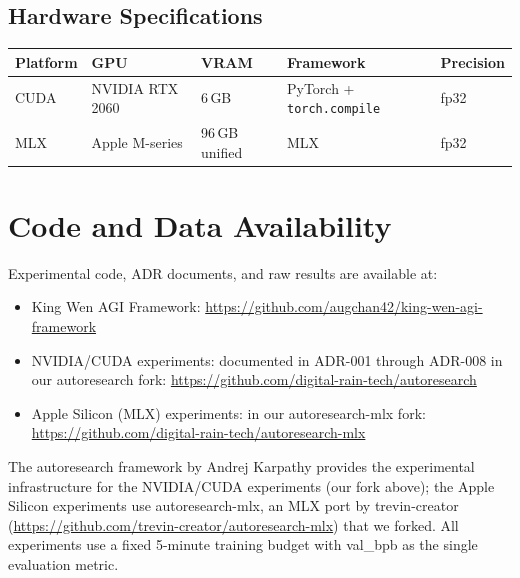 \documentclass{article}
\begin{document}
\subsection{Hardware Specifications}

\begin{table}[h]
\centering
\begin{tabular}{lllll}
\toprule
\textbf{Platform} & \textbf{GPU} & \textbf{VRAM} & \textbf{Framework} & \textbf{Precision} \\
\midrule
CUDA & NVIDIA RTX 2060 & 6\,GB & PyTorch + \texttt{torch.compile} & fp32 \\
MLX & Apple M-series & 96\,GB unified & MLX & fp32 \\
\bottomrule
\end{tabular}
\end{table}

\section{Code and Data Availability}\label{app:code}

Experimental code, ADR documents, and raw results are available at:

\begin{itemize}
\tightlist
\item King Wen AGI Framework: \url{https://github.com/augchan42/king-wen-agi-framework}
\item NVIDIA/CUDA experiments: documented in ADR-001 through ADR-008 in our autoresearch fork: \url{https://github.com/digital-rain-tech/autoresearch}
\item Apple Silicon (MLX) experiments: in our autoresearch-mlx fork: \url{https://github.com/digital-rain-tech/autoresearch-mlx}
\end{itemize}

The autoresearch framework by Andrej Karpathy provides the experimental infrastructure for the NVIDIA/CUDA experiments (our fork above); the Apple Silicon experiments use autoresearch-mlx, an MLX port by trevin-creator (\url{https://github.com/trevin-creator/autoresearch-mlx}) that we forked. All experiments use a fixed 5-minute training budget with val\_bpb as the single evaluation metric.
\end{document}
